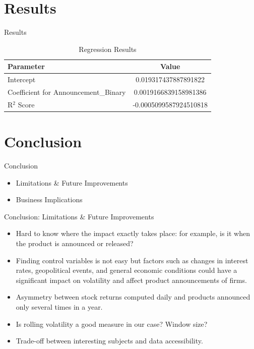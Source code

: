 \documentclass{beamer}
\begin{document}
\section{Results}

\begin{frame}{Results}

  \begin{table}[ht]
    \centering
    \begin{tabular}{lc}
        \toprule
        \textbf{Parameter} & \textbf{Value} \\
        \midrule
        Intercept & 0.019317437887891822 \\
        Coefficient for Announcement\_Binary & 0.0019166839158981386 \\
        R\(^2\) Score & -0.0005099587924510818 \\
        \bottomrule
    \end{tabular}
    \caption{Regression Results}
    \label{tab:regression_outputs}
\end{table}

\end{frame}


\section{Conclusion}

\begin{frame}{Conclusion}
  \begin{itemize}
    \item Limitations \& Future Improvements
    \item Business Implications
  \end{itemize}
\end{frame}

\begin{frame}{Conclusion: Limitations \& Future Improvements}
  \begin{itemize}
    \item Hard to know where the impact exactly takes place: for example, is it when the product is announced or released?
    \item Finding control variables is not easy but factors such as changes in interest rates, geopolitical events, and general economic conditions could have a significant impact on volatility and affect product announcements of firms.
    \item Asymmetry between stock returns computed daily and products announced only several times in a year.
    \item Is rolling volatility a good measure in our case? Window size?
    \item Trade-off between interesting subjects and data accessibility.
  \end{itemize}
\end{frame}
\end{document}
